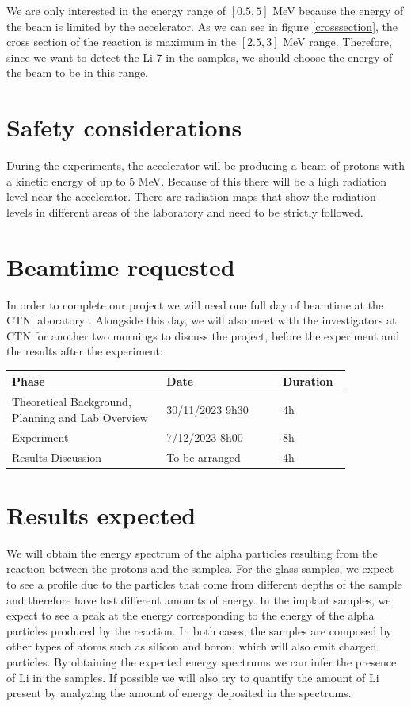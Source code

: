 \documentclass{article}
\begin{document}
\begin{multicols}{2}
We are only interested in the energy range of $[0.5,5]$ MeV because the energy of the beam is limited by the accelerator.
As we can see in figure \ref{crosssection}, the cross section of the reaction is maximum in the $[2.5,3]$ MeV range. 
Therefore, since we want to detect the Li-7 in the samples, we should choose the energy of the beam to be in this range.

\section{Safety considerations}

During the experiments, the accelerator will be producing a beam of protons with a kinetic energy of up to 5 MeV. Because of this there will be a high radiation level near the accelerator.
There are radiation maps that show the radiation levels in different areas of the laboratory and need to be strictly followed.

\section{Beamtime requested}

In order to complete our project we will need one full day of beamtime at the CTN laboratory \cite{IST}. Alongside this day, we will
also meet with the investigators at CTN for another two mornings to discuss the project, before the experiment and the
results after the experiment:

\begin{table}[H]
\centering
\begin{tabular}{|w{0.4\linewidth}|w{0.3\linewidth}|w{0.15\linewidth}|}
\hline
Phase & Date & Duration \\ \hline
Theoretical Background, Planning and Lab Overview & 30/11/2023 9h30 & 4h \\ \hline
Experiment & 7/12/2023 8h00 & 8h \\ \hline
Results Discussion & To be arranged & 4h \\ \hline
\end{tabular}
\end{table}

\section{Results expected}

We will obtain the energy spectrum of the alpha particles resulting from the reaction between the protons and the
samples. 
For the glass samples, we expect to see a profile due to the particles that come from different depths of the sample and
therefore have lost different amounts of energy. In the implant samples, we expect to see a peak at the energy corresponding
to the energy of the alpha particles produced by the reaction.
In both cases, the samples are composed by other types of atoms such as silicon and boron, which will also emit charged
particles. By obtaining the expected energy spectrums we can infer the presence of Li in the samples. If possible we will also try
to quantify the amount of Li present by analyzing the amount of energy deposited in the spectrums.


\end{multicols}
\end{document}
